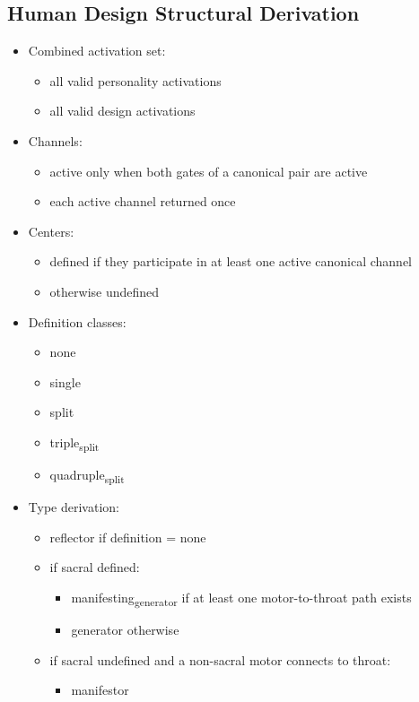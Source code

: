 \documentclass[11pt]{article}
\begin{document}
\subsection{Human Design Structural Derivation}
\label{sec:org1166655}
\begin{itemize}
\item Combined activation set:
\begin{itemize}
\item all valid personality activations
\item all valid design activations
\end{itemize}
\item Channels:
\begin{itemize}
\item active only when both gates of a canonical pair are active
\item each active channel returned once
\end{itemize}
\item Centers:
\begin{itemize}
\item defined if they participate in at least one active canonical channel
\item otherwise undefined
\end{itemize}
\item Definition classes:
\begin{itemize}
\item none
\item single
\item split
\item triple\textsubscript{split}
\item quadruple\textsubscript{split}
\end{itemize}
\item Type derivation:
\begin{itemize}
\item reflector if definition = none
\item if sacral defined:
\begin{itemize}
\item manifesting\textsubscript{generator} if at least one motor-to-throat path exists
\item generator otherwise
\end{itemize}
\item if sacral undefined and a non-sacral motor connects to throat:
\begin{itemize}
\item manifestor
\end{itemize}

\end{itemize}
\end{itemize}
\end{document}
